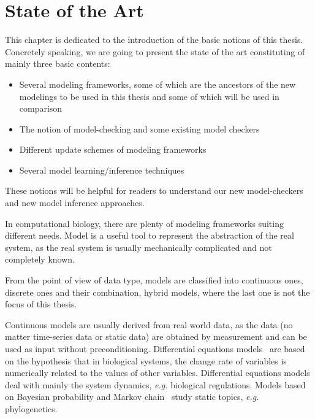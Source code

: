 \chapter{State of the Art}\label{chap:stateOfTheArt}

\begin{mybox}
This chapter is dedicated to the introduction of the basic notions of this thesis.
Concretely speaking, we are going to present the state of the art constituting of mainly three basic contents:

\begin{itemize}
    \item Several modeling frameworks, some of which are the ancestors of the new modelings to be used in this thesis and some of which will be used in comparison
    \item The notion of model-checking and some existing %
    model checkers 
    \item Different update schemes of modeling frameworks
    \item Several model learning/inference techniques
\end{itemize}

These notions will be helpful for readers to understand our new model-checkers and new model inference approaches.
\end{mybox}

In computational biology, there are plenty of modeling frameworks suiting different needs.
Model is a useful tool to represent the abstraction of the real system, as the real system is usually mechanically complicated and not completely known.

From the point of view of data type, models are classified into continuous ones, discrete ones and their combination, hybrid models, where the last one is not the focus of this thesis.

Continuous models are usually derived from real world data, as the data (no matter time-series data or static data) are obtained by measurement and can be used as input without preconditioning.
Differential equations models~\cite{glass1973logical,snoussi1989qualitative,thomas1990biological} are based on the hypothesis that in biological systems, the change rate of variables is numerically related to the values of other variables. 
Differential equations models deal with mainly the system dynamics, \textit{e.g.} biological regulations.
Models based on Bayesian probability and Markov chain~\cite{huelsenbeck2001mrbayes,larget1999markov} study static topics, \textit{e.g.} phylogenetics.

